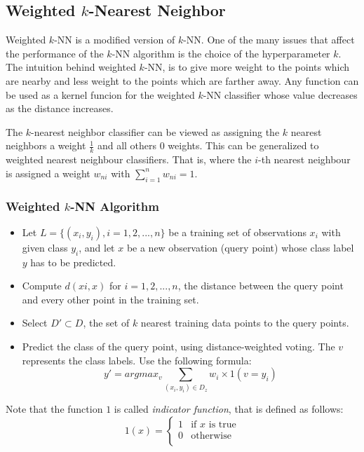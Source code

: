 \subsection{Weighted \(k\)-Nearest Neighbor}
Weighted \(k\)-NN is a modified version of \(k\)-NN. One of the many issues that affect the performance of the \(k\)-NN algorithm is the choice of the hyperparameter \(k\). The intuition behind weighted \(k\)-NN, is to give more weight to the points which are nearby and less weight to the points which are farther away. Any function can be used as a kernel funcion for the weighted \(k\)-NN classifier whose value decreases as the distance increases.

The \(k\)-nearest neighbor classifier can be viewed as assigning the \(k\) nearest neighbors a weight \(\frac 1 k\) and all others \(0\) weights. This can be generalized to weighted nearest neighbour classifiers. That is, where the \(i\)-th nearest neighbour is assigned a weight \(w_{ni}\) with \(\sum_{i=1}^nw_{ni}=1\). 

\subsubsection{Weighted \(k\)-NN Algorithm}
\begin{itemize}
    \item
    Let \(L=\{(x_i,y_i), i=1,2,...,n\}\) be a training set of observations \(x_i\) with given class \(y_i\), and let \(x\) be a new observation (query point) whose class label \(y\) has to be predicted.
    \item
    Compute \(d(xi,x)\) for \(i=1,2,...,n\), the distance between the query point and every other point in the training set.
    \item
    Select \(D' \subset D\), the set of \(k\) nearest training data points to the query points.
    \item
    Predict the class of the query point, using distance-weighted voting. The \(v\) represents the class labels. Use the following formula:
    \begin{equation}
        y'=argmax_v \sum_{(x_i,y_i) \in D_z}w_i \times 1(v=y_i)
    \end{equation}
\end{itemize}
Note that the function \(1\) is called \emph{indicator function}, that is defined as follows:
\begin{equation}
    1(x) = 
    \begin{cases}
        1                    &\text{if } x \text{ is true}\\
        0                    &\text{otherwise}\\
    \end{cases}
\end{equation}

